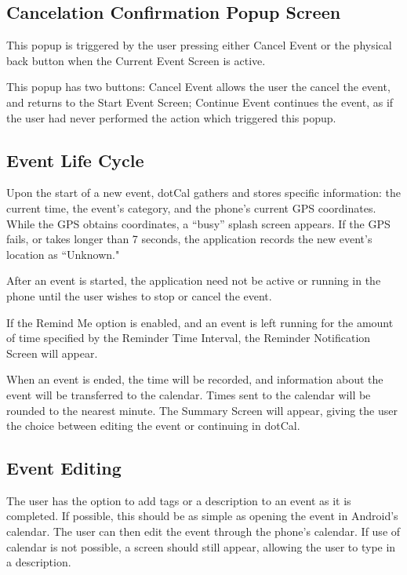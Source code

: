 \documentclass[11pt]{article}
\newcommand{\bt}[1]{{\sc #1}}
\begin{document}
\subsection{Cancelation Confirmation Popup Screen}

This popup is triggered by the user pressing either \bt{Cancel Event} or the physical back button when the Current Event Screen is active.

This popup has two buttons: \bt{Cancel Event} allows the user the cancel the event, and returns to the Start Event Screen; \bt{Continue Event} continues the event, as if the user had never performed the action which triggered this popup.

\subsection{Event Life Cycle}

Upon the start of a new event, dotCal gathers and stores specific information: the current time, the event's category, and the phone's current GPS coordinates. While the GPS obtains coordinates, a ``busy'' splash screen appears. If the GPS fails, or takes longer than 7 seconds, the application records the new event's location as ``Unknown."

After an event is started, the application need not be active or running in the phone until the user wishes to stop or cancel the event.

If the Remind Me option is enabled, and an event is left running for the amount of time specified by the Reminder Time Interval, the Reminder Notification Screen will appear.

When an event is ended, the time will be recorded, and information about the event will be transferred to the calendar. Times sent to the calendar will be rounded to the nearest minute. The Summary Screen will appear, giving the user the choice between editing the event or continuing in dotCal.


\subsection{Event Editing}

The user has the option to add tags or a description to an event as it is completed. If possible, this should be as simple as opening the event in Android's calendar. The user can then edit the event through the phone's calendar. If use of calendar is not possible, a screen should still appear, allowing the user to type in a description.
\end{document}

